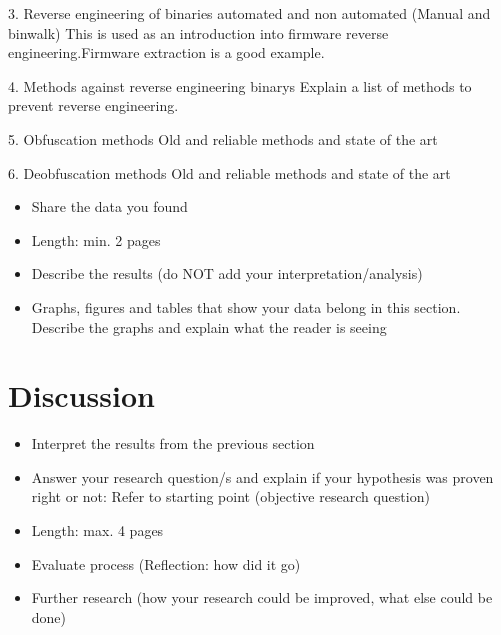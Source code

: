 \documentclass[]{report}
\begin{document}
3. Reverse engineering of binaries automated and non automated (Manual and binwalk)
	This is used as an introduction into firmware reverse engineering.Firmware extraction is a good example.

4. Methods against reverse engineering binarys
	Explain a list of methods to prevent reverse engineering.
	
5. Obfuscation methods 
	Old and reliable methods and state of the art
	
6. Deobfuscation methods
	Old and reliable methods and state of the art


\begin{itemize}
	\item Share the data you found
	\item Length: min. 2 pages
	\item Describe the results (do NOT add your interpretation/analysis)
	\item Graphs, figures and tables that show your data belong in this section. Describe the graphs and explain what the reader is seeing

\end{itemize}

	
\section{Discussion}
\begin{itemize}
	\item Interpret the results from the previous section
	\item Answer your research question/s and explain if your hypothesis was proven right or not: Refer to starting point (objective research question)

	\item Length: max. 4 pages
	\item Evaluate process (Reflection: how did it go)
	\item Further research (how your research could be improved, what else could be done)
\end{itemize}
\end{document}

